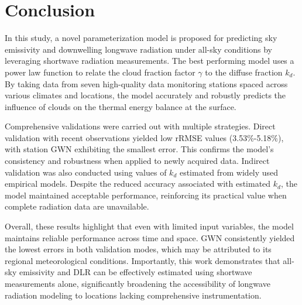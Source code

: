 \documentclass[preprint,12pt]{elsarticle}
\begin{document}

\section{Conclusion}

In this study, a novel parameterization model is proposed for predicting sky emissivity and downwelling longwave radiation under all-sky conditions by leveraging shortwave radiation measurements. The best performing model uses a power law function to relate the cloud fraction factor $\gamma$ to the diffuse fraction $k_d$. By taking data from seven high-quality data monitoring stations spaced across various climates and locations, the model accurately and robustly predicts the influence of clouds on the thermal energy balance at the surface.

Comprehensive validations were carried out with multiple strategies. Direct validation with recent observations yielded low rRMSE values (3.53\%-5.18\%), with station GWN exhibiting the smallest error. This confirms the model's consistency and robustness when applied to newly acquired data. Indirect validation was also conducted using values of $k_d$ estimated from widely used empirical models. Despite the reduced accuracy associated with estimated $k_d$, the model maintained acceptable performance, reinforcing its practical value when complete radiation data are unavailable.

Overall, these results highlight that even with limited input variables, the model maintains reliable performance across time and space. GWN consistently yielded the lowest errors in both validation modes, which may be attributed to its regional meteorological conditions. Importantly, this work demonstrates that all-sky emissivity and DLR can be effectively estimated using shortwave measurements alone, significantly broadening the accessibility of longwave radiation modeling to locations lacking comprehensive instrumentation.
\end{document}
